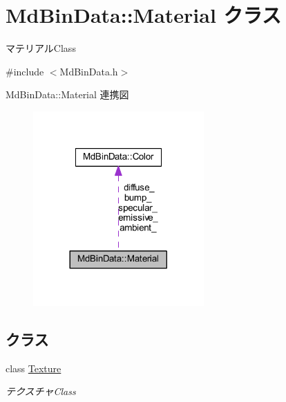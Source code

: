 \hypertarget{class_md_bin_data_1_1_material}{}\section{Md\+Bin\+Data\+:\+:Material クラス}
\label{class_md_bin_data_1_1_material}


マテリアル\+Class  




{\ttfamily \#include $<$Md\+Bin\+Data.\+h$>$}



Md\+Bin\+Data\+:\+:Material 連携図\nopagebreak
\begin{figure}[H]
\begin{center}
\leavevmode
\includegraphics[width=185pt]{class_md_bin_data_1_1_material__coll__graph}
\end{center}
\end{figure}
\subsection*{クラス}
\begin{DoxyCompactItemize}
\item 
class \mbox{\hyperlink{class_md_bin_data_1_1_material_1_1_texture}{Texture}}
\begin{DoxyCompactList}\small\item\em テクスチャ\+Class \end{DoxyCompactList}\end{DoxyCompactItemize}
